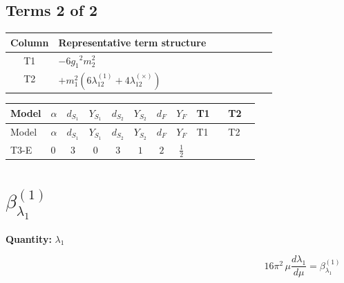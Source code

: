 \documentclass[8pt]{article}
\begin{document}
\begin{landscape}
\subsection*{Terms 2 of 2}
\begin{center}
\begin{tabular}{@{}c >{\raggedright\arraybackslash}p{0.82\linewidth}@{}}
\toprule
Column & Representative term structure \\
\midrule
T1 & \(\displaystyle -6 {g_1}^2 {m_2^2}\) \\
\midrule
T2 & \(\displaystyle +{m_1^2} (6 {\lambda_{12}^{(1)}}+4 {\lambda_{12}^{(\times)}})\) \\
\midrule
\bottomrule
\end{tabular}
\end{center}
\smallskip
\tiny
\begin{longtable}{@{}llcccccc >{\raggedright\arraybackslash}p{0.21\linewidth} >{\raggedright\arraybackslash}p{0.21\linewidth}@{}}
\toprule
Model & $\alpha$ & $d_{S_1}$ & $Y_{S_1}$ & $d_{S_2}$ & $Y_{S_2}$ & $d_F$ & $Y_F$ & T1 & T2 \\
\midrule
\endfirsthead
\toprule
Model & $\alpha$ & $d_{S_1}$ & $Y_{S_1}$ & $d_{S_2}$ & $Y_{S_2}$ & $d_F$ & $Y_F$ & T1 & T2 \\
\midrule
\endhead
T3-E & $0$ & $3$ & $0$ & $3$ & $1$ & $2$ & $\frac{1}{2}$ & \scriptsize\adjustbox{max width=\linewidth}{$\begin{gathered} -6 {g_1}^2 {m_2^2}\end{gathered}$} & \scriptsize\adjustbox{max width=\linewidth}{$\begin{gathered} +{m_1^2} (6 {\lambda_{12}^{(1)}}+4 {\lambda_{12}^{(\times)}})\end{gathered}$} \\
\midrule
\bottomrule
\end{longtable}
\clearpage
\section*{$\beta_{\lambda_1}^{(1)}$}
\noindent\textbf{Quantity: }$\lambda_1$\par\smallskip
\[16\pi^2\,\mu\frac{d \lambda_1}{d\mu}=\beta_{\lambda_1}^{(1)}\]

\end{landscape}
\end{document}
